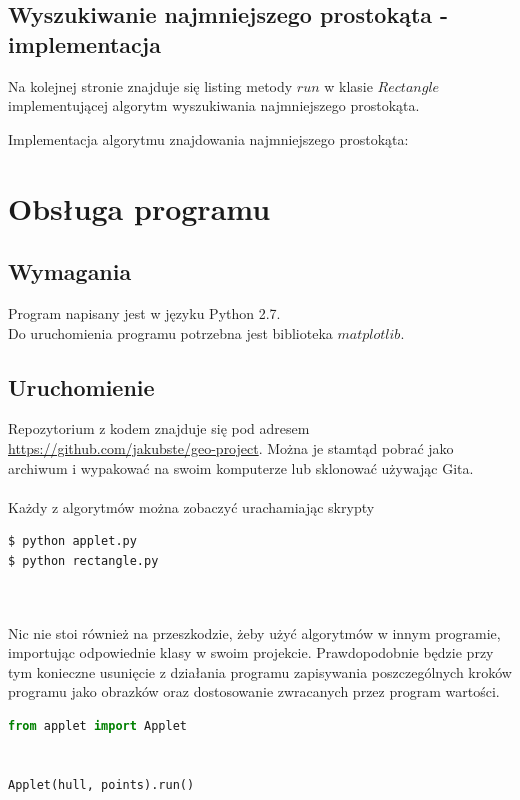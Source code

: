 \documentclass[hidelinks]{article}
\begin{document}
\subsection{Wyszukiwanie najmniejszego prostokąta - implementacja}
Na kolejnej stronie znajduje się listing metody $run$ w klasie $Rectangle$ implementującej algorytm wyszukiwania najmniejszego prostokąta.

Implementacja algorytmu znajdowania najmniejszego prostokąta:
\begin{center}

\end{center}

\restoregeometry


\section{Obsługa programu}
\subsection{Wymagania}
Program napisany jest w języku Python 2.7. \\
Do uruchomienia programu potrzebna jest biblioteka $matplotlib$.

\subsection{Uruchomienie}
Repozytorium z kodem znajduje się pod adresem \url{https://github.com/jakubste/geo-project}. Można je stamtąd pobrać jako archiwum i wypakować na swoim komputerze lub sklonować używając Gita. \\ ~ \\
Każdy z algorytmów można zobaczyć urachamiając skrypty
\begin{lstlisting}[language=bash,frame=single,linewidth=1\textwidth]
$ python applet.py
$ python rectangle.py
\end{lstlisting}
~ \\ ~ \\
Nic nie stoi również na przeszkodzie, żeby użyć algorytmów w innym programie, importując odpowiednie klasy w swoim projekcie. Prawdopodobnie będzie przy tym konieczne usunięcie z działania programu zapisywania poszczególnych kroków programu jako obrazków oraz dostosowanie zwracanych przez program wartości.

\begin{lstlisting}[language=python,frame=single,linewidth=1\textwidth]
from applet import Applet


Applet(hull, points).run()
\end{lstlisting}
\end{document}
